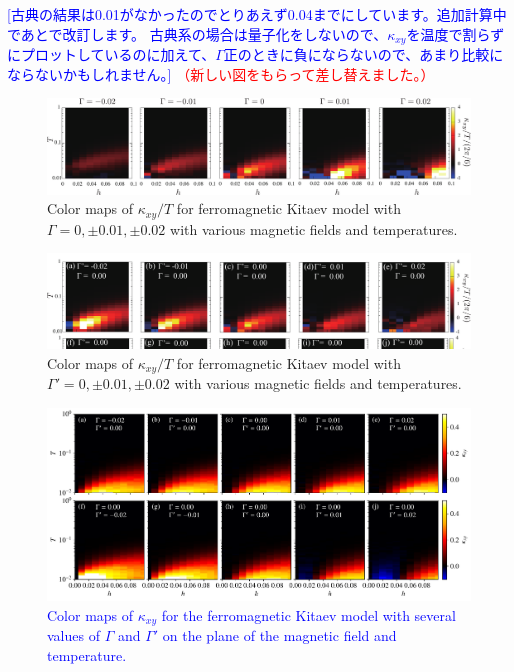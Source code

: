\documentclass[reprint,amsmath,amssymb,aps,prx]{revtex4-2}
\newcommand{\red}[1]{\textcolor{red}{#1}}
\newcommand{\blue}[1]{\textcolor{blue}{#1}}
\begin{document}
\blue{[古典の結果は0.01がなかったのでとりあえず0.04までにしています。追加計算中であとで改訂します。
古典系の場合は量子化をしないので、$\kappa_{xy}$を温度で割らずにプロットしているのに加えて、$\Gamma$正のときに負にならないので、あまり比較にならないかもしれません。]}\red{ （新しい図をもらって差し替えました。）}

\begin{figure}
  \begin{center}
    \includegraphics[width=\linewidth]{Figs/color_map_G.pdf}
  \end{center}
  \caption{Color maps of $\kappa_{xy}/T$ for ferromagnetic Kitaev model with $\Gamma = 0, \pm 0.01, \pm 0.02$ with various magnetic fields and temperatures.}
  \label{fig:color_map_G}
\end{figure}

\begin{figure}
  \begin{center}
    \includegraphics[width=\linewidth]{Figs/color_map_Gp.pdf}
  \end{center}
  \caption{Color maps of $\kappa_{xy}/T$ for ferromagnetic Kitaev model with $\Gamma' = 0, \pm 0.01, \pm 0.02$ with various magnetic fields and temperatures.}
  \label{fig:color_map_Gp}
\end{figure}


\begin{figure}
  \begin{center}
    \includegraphics[width=\linewidth]{Figs/fig_cmap_classical.pdf}
  \end{center}
  \caption{\blue{Color maps of $\kappa_{xy}$ for the ferromagnetic Kitaev model with several values of $\Gamma$ and $\Gamma'$ on the plane of the magnetic field and temperature.}}
  \label{fig:cmap_classical}
\end{figure}
\end{document}
